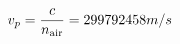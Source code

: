 \documentclass[preview]{standalone}
\begin{document}
\begin{align*}
\special{dvisvgm:raw <g id='unique000'>}v_p = \frac{c}{n_{\text{air}}} = 299792458 m/s\special{dvisvgm:raw </g>}
\end{align*}
\end{document}
